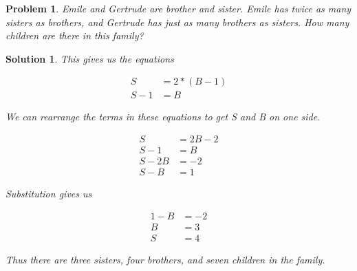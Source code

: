 \documentclass{article}
\newtheorem*{problem}{Problem}
\newtheorem*{solution}{Solution}
\begin{document}
\begin{problem}
Emile and Gertrude are brother and sister. Emile has twice as many sisters as brothers, and Gertrude has just as many brothers as sisters. How many children are there in this family?
\end{problem}

\begin{solution}
This gives us the equations

\begin{align*}
S &= 2*(B-1) \\
S-1 &= B
\end{align*}

We can rearrange the terms in these equations to get S and B on one side.

\begin{align*}
S &= 2B - 2 \\
S-1 &= B \\
S - 2B &= - 2 \\
S - B &= 1
\end{align*}

Substitution gives us

\begin{align*}
1 - B &= -2 \\
B &= 3 \\
S &= 4
\end{align*}

Thus there are three sisters, four brothers, and seven children in the family.

\end{solution}
\end{document}
